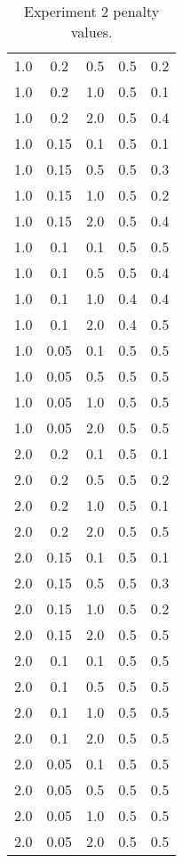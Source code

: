 \begin{table}[ht]
\begin{tabular}{c|c|c|c|c}
1.0 & 0.2 & 0.5 & 0.5 & 0.2 \\
1.0 & 0.2 & 1.0 & 0.5 & 0.1 \\
1.0 & 0.2 & 2.0 & 0.5 & 0.4 \\
1.0 & 0.15 & 0.1 & 0.5 & 0.1 \\
1.0 & 0.15 & 0.5 & 0.5 & 0.3 \\
1.0 & 0.15 & 1.0 & 0.5 & 0.2 \\
1.0 & 0.15 & 2.0 & 0.5 & 0.4 \\
1.0 & 0.1 & 0.1 & 0.5 & 0.5 \\
1.0 & 0.1 & 0.5 & 0.5 & 0.4 \\
1.0 & 0.1 & 1.0 & 0.4 & 0.4 \\
1.0 & 0.1 & 2.0 & 0.4 & 0.5 \\
1.0 & 0.05 & 0.1 & 0.5 & 0.5 \\
1.0 & 0.05 & 0.5 & 0.5 & 0.5 \\
1.0 & 0.05 & 1.0 & 0.5 & 0.5 \\
1.0 & 0.05 & 2.0 & 0.5 & 0.5 \\
2.0 & 0.2 & 0.1 & 0.5 & 0.1 \\
2.0 & 0.2 & 0.5 & 0.5 & 0.2 \\
2.0 & 0.2 & 1.0 & 0.5 & 0.1 \\
2.0 & 0.2 & 2.0 & 0.5 & 0.5 \\
2.0 & 0.15 & 0.1 & 0.5 & 0.1 \\
2.0 & 0.15 & 0.5 & 0.5 & 0.3 \\
2.0 & 0.15 & 1.0 & 0.5 & 0.2 \\
2.0 & 0.15 & 2.0 & 0.5 & 0.5 \\
2.0 & 0.1 & 0.1 & 0.5 & 0.5 \\
2.0 & 0.1 & 0.5 & 0.5 & 0.5 \\
2.0 & 0.1 & 1.0 & 0.5 & 0.5 \\
2.0 & 0.1 & 2.0 & 0.5 & 0.5 \\
2.0 & 0.05 & 0.1 & 0.5 & 0.5 \\
2.0 & 0.05 & 0.5 & 0.5 & 0.5 \\
2.0 & 0.05 & 1.0 & 0.5 & 0.5 \\
2.0 & 0.05 & 2.0 & 0.5 & 0.5 \\
\hline
\end{tabular}
\caption{Experiment 2 penalty values.}
\label{tab:Penalties}
\end{table}


